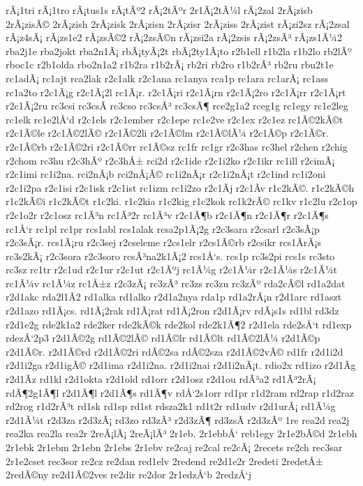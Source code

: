 {rÃ¡1tri
rÃ¡1tro
rÃ¡tus1s
rÃ¡tÃº2
rÃ¡2tÃºr
2r1Ã¡2tÃ¼l
rÃ¡2zal
2rÃ¡zisb
2rÃ¡zisÃ©
2rÃ¡zish
2rÃ¡zisk
2rÃ¡zisn
2rÃ¡zisr
2rÃ¡ziss
2rÃ¡zist
rÃ¡zi2sz
rÃ¡2zsal
rÃ¡z4sÃ¡
rÃ¡zs1e2
rÃ¡zsÃ©2
rÃ¡2zsÃ©n
rÃ¡zsi2a
rÃ¡2zsis
rÃ¡2zsÃ³
rÃ¡zs1Ã¼2
rba2j1e
rba2jokt
rba2n1Ã¡
rbÃ¡tyÃ¡2t
rbÃ¡2ty1Ã¡to
r2b1ell
r1b2la
r1b2lo
rb2lÃº
rboc1c
r2b1olda
rbo2n1a2
r1b2ra
r1b2rÃ¡
rb2ri
rb2ro
r1b2rÃ³
rb2ru
rbu2t1e
rc1adÃ¡
rc1ajt
rca2lak
r2c1alk
r2c1ana
rc1anya
rca1p
rc1ara
rc1arÃ¡
rc1ass
rc1a2to
r2c1Ã¡g
r2c1Ã¡2l
rc1Ã¡r.
r2c1Ã¡ri
r2c1Ã¡rn
r2c1Ã¡2ro
r2c1Ã¡rr
r2c1Ã¡rt
r2c1Ã¡2ru
rc3csi
rc3csÃ­
rc3cso
rc3csÃ³
rc3csÃ¶
rce2g1a2
rceg1g
rc1egy
rc1e2leg
rc1elk
rc1e2lÅ‘d
r2c1els
r2c1ember
r2c1epe
rc1e2ve
r2c1ex
r2c1ez
rc1Ã©2kÃ©t
r2c1Ã©le
r2c1Ã©2lÃ©
r2c1Ã©2li
r2c1Ã©lm
r2c1Ã©lÃ¼
r2c1Ã©p
r2c1Ã©r.
r2c1Ã©rb
r2c1Ã©2ri
r2c1Ã©rr
rc1Ã©sz
rc1fr
rc1gr
r2c3has
rc3hel
r2chen
r2chig
r2chom
rc3hu
r2c3hÃº
r2c3hÅ±
rci2d
r2c1ide
r2c1i2ko
r2c1ikr
rc1ill
r2cimÃ¡
r2c1imi
rc1i2na.
rci2nÃ¡b
rci2nÃ¡Ã©
rc1i2nÃ¡r
r2c1i2nÃ¡t
r2c1ind
rc1i2oni
r2c1i2pa
r2c1isi
r2c1isk
r2c1ist
rc1izm
rc1i2zo
r2c1Ã­j
r2c1Ã­v
r1c2kÃ©.
r1c2kÃ©h
r1c2kÃ©i
r1c2kÃ©t
r1c2ki.
r1c2kia
r1c2kig
r1c2kok
rc1k2rÃ©
rc1kv
r1c2lu
r2c1op
r2c1o2r
r2c1osz
rc1Ã³n
rc1Ã³2r
rc1Ã³v
r2c1Ã¶b
r2c1Ã¶n
r2c1Ã¶r
r2c1Ã¶s
rc1Å‘r
rc1pl
rc1pr
rcs1abl
rcs1alak
rcsa2p1Ã¡2g
r2c3sara
r2csarl
r2c3sÃ¡p
r2c3sÃ¡r.
rcs1Ã¡ru
r2c3sej
r2cseleme
r2cs1elr
r2cs1Ã©rb
r2csikr
rcs1Ã­rÃ¡s
rc3s2kÃ¡
r2c3sora
r2c3soro
rcsÃ³na2k1Ã¡2
rcs1Å‘s.
rcs1p
rc3s2pi
rcs1s
rc3sto
rc3sz
rc1tr
r2c1ud
r2c1ur
r2c1ut
r2c1Ãºj
rc1Ã¼g
r2c1Ã¼r
r2c1Ã¼s
r2c1Ã¼t
rc1Ã¼v
rc1Ã¼z
rc1Å±z
r2c3zÃ¡
rc3zÃ³
rc3zs
rc3zu
rc3zÃº
rda2cÃ©l
rd1a2dat
r2d1akc
rda2l1Ã­2
rd1alka
rd1alko
r2d1a2nya
rda1p
rd1a2rÃ¡n
r2d1arc
rd1aszt
r2d1azo
rd1Ã¡cs.
rd1Ã¡2rak
rd1Ã¡rat
rd1Ã¡2ron
r2d1Ã¡rv
rdÃ¡s1s
rd1bl
rd3dz
r2d1e2g
rde2k1a2
rde2ker
rde2kÃ©k
rde2kol
rde2k1Ã¶2
r2d1ela
rde2sÅ‘t
rd1exp
rdezÅ‘2p3
r2d1Ã©2g
rd1Ã©2lÃ©
rd1Ã©lr
rd1Ã©lt
rd1Ã©2lÃ¼
r2d1Ã©p
r2d1Ã©r.
r2d1Ã©rd
r2d1Ã©2ri
rdÃ©2sa
rdÃ©2sza
r2d1Ã©2vÃ©
rd1fr
r2d1i2d
r2d1i2ga
r2d1igÃ©
r2d1ima
r2d1i2na.
r2d1i2nai
r2d1i2nÃ¡t.
rdio2x
rd1izo
r2d1Ã­g
r2d1Ã­z
rd1kl
r2d1okta
r2d1old
rd1orr
r2d1osz
r2d1ou
rdÃ³a2
rd1Ã³2rÃ¡
rdÃ¶2g1Ã¶l
r2d1Ã¶l
r2d1Ã¶s
rd1Ã¶v
rdÅ‘2s1orr
rd1pr
r1d2ram
rd2rap
r1d2raz
rd2rog
r1d2rÃ³t
rd1sk
rd1sp
rd1st
rdsza2k1
rd1t2r
rd1udv
r2d1urÃ¡
rd1Ã¼g
r2d1Ã¼t
r2d3za
r2d3zÃ¡
rd3zo
rd3zÃ³
r2d3zÃ¶
rd3zsÃ­
r2d3zÃº
1re
rea2d
rea2j
rea2ka
rea2la
rea2r
2reÃ¡lÃ¡
2reÃ¡lÃ³
2r1eb.
2r1ebbÅ‘
reb1egy
2r1e2bÃ©d
2r1ebh
2r1ebk
2r1ebm
2r1ebn
2r1ebs
2r1ebv
re2caj
re2cal
re2cÃ¡
2recets
re2ch
rec3sar
2r1e2cset
rec3sor
re2cz
re2dan
red1elv
2redend
re2d1e2r
2redeti
2redetÅ±
2redÃ©ny
re2d1Ã©2ves
re2dir
re2dor
2r1edzÅ‘b
2redzÅ‘j
}
